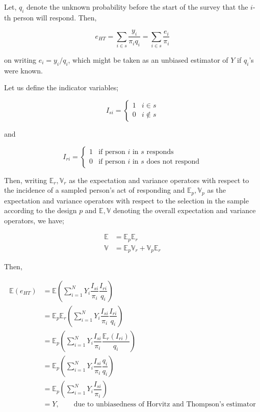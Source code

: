 \documentclass[12pt]{article}
\newcommand{\E}{\mathbb{E}}
\newcommand{\Var}{\mathbb{V}}
\theoremstyle{definition}
\begin{document}
Let, $q_i$ denote the unknown probability before the start of the survey that the $i$-th person will respond. Then,

$$e_{HT} = \sum_{i \in s} \dfrac{y_i}{\pi_i q_i} = \sum_{i \in s} \dfrac{e_i}{\pi_i}$$

on writing $e_i = y_i/q_i$, which might be taken as an unbiased estimator of $Y$ if $q_i$'s were known.

Let us define the indicator variables;

$$I_{si} = \begin{cases}
    1 & i \in s\\
    0 & i \notin s
\end{cases}$$

and 

$$I_{ri} = \begin{cases}
    1 & \text{if person } i \text{ in } s \text{ responds}\\
    0 & \text{if person } i \text{ in } s \text{ does not respond}
\end{cases}$$

Then, writing $\E_r, \Var_r$ as the expectation and variance operators with respect to the incidence of a sampled person's act of responding and $\E_p, \Var_p$ as the expectation and variance operators with respect to the selection in the sample according to the design $p$ and $\E, \Var$ denoting the overall expectation and variance operators, we have;

\begin{align*}
    \E & = \E_p \E_r\\
    \Var & = \E_p \Var_r + \Var_p \E_r
\end{align*}


Then,

\begin{align*}
    \E(e_{HT})
    & = \E\left( \sum_{i=1}^{N} Y_i \dfrac{I_{si}}{\pi_i} \dfrac{I_{ri}}{q_i} \right)\\
    & = \E_p \E_r\left( \sum_{i=1}^{N} Y_i \dfrac{I_{si}}{\pi_i} \dfrac{I_{ri}}{q_i} \right)\\
    & = \E_p \left( \sum_{i=1}^{N} Y_i \dfrac{I_{si}}{\pi_i} \dfrac{\E_r(I_{ri}) }{q_i} \right)\\
    & = \E_p\left( \sum_{i=1}^{N} Y_i \dfrac{I_{si}}{\pi_i} \dfrac{q_i}{q_i} \right)\\
    & = \E_p\left( \sum_{i=1}^{N} Y_i \dfrac{I_{si}}{\pi_i} \right)\\
    & = Y, \qquad \text{due to unbiasedness of Horvitz and Thompson's estimator}
\end{align*}
\end{document}

